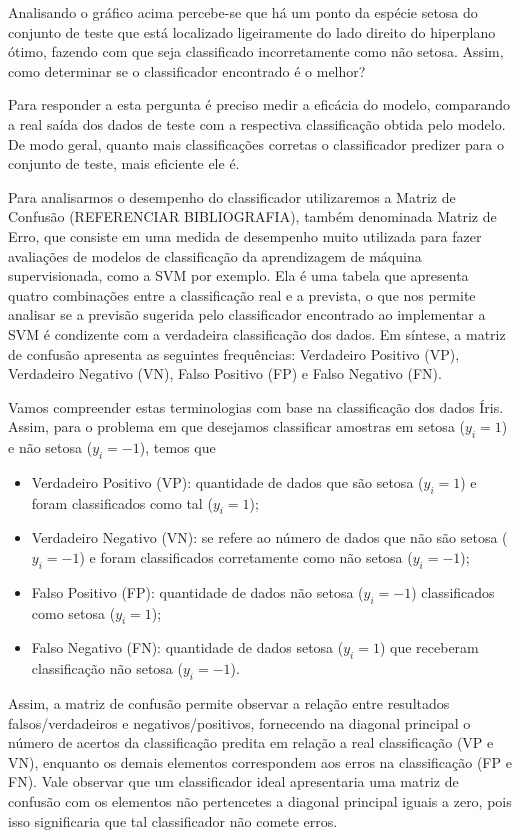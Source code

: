 \documentclass[12pt,a4paper]{scrartcl}
\theoremstyle{definition}%
\begin{document}
    Analisando o gráfico acima percebe-se que há um ponto da espécie setosa
do conjunto de teste que está localizado ligeiramente do lado direito do
hiperplano ótimo, fazendo com que seja classificado incorretamente como
não setosa. Assim, como determinar se o classificador encontrado é o
melhor?

Para responder a esta pergunta é preciso medir a eficácia do modelo,
comparando a real saída dos dados de teste com a respectiva
classificação obtida pelo modelo. De modo geral, quanto mais
classificações corretas o classificador predizer para o conjunto de
teste, mais eficiente ele é.

Para analisarmos o desempenho do classificador utilizaremos a Matriz de
Confusão (REFERENCIAR BIBLIOGRAFIA), também denominada Matriz de Erro,
que consiste em uma medida de desempenho muito utilizada para fazer
avaliações de modelos de classificação da aprendizagem de máquina
supervisionada, como a SVM por exemplo. Ela é uma tabela que apresenta
quatro combinações entre a classificação real e a prevista, o que nos
permite analisar se a previsão sugerida pelo classificador encontrado ao
implementar a SVM é condizente com a verdadeira classificação dos dados.
Em síntese, a matriz de confusão apresenta as seguintes frequências:
Verdadeiro Positivo (VP), Verdadeiro Negativo (VN), Falso Positivo (FP)
e Falso Negativo (FN).

Vamos compreender estas terminologias com base na classificação dos
dados Íris. Assim, para o problema em que desejamos classificar amostras
em setosa (\(y_{i} = 1\)) e não setosa (\(y_{i} = -1\)), temos que

\begin{itemize}
\item
  Verdadeiro Positivo (VP): quantidade de dados que são setosa
  (\(y_{i} = 1\)) e foram classificados como tal (\(y_{i} = 1\));
\item
  Verdadeiro Negativo (VN): se refere ao número de dados que não são
  setosa (\(y_{i} = -1\)) e foram classificados corretamente como não
  setosa (\(y_{i} = -1\));
\item
  Falso Positivo (FP): quantidade de dados não setosa (\(y_{i} = -1\))
  classificados como setosa (\(y_{i} = 1\));
\item
  Falso Negativo (FN): quantidade de dados setosa (\(y_{i} = 1\)) que
  receberam classificação não setosa (\(y_{i} = -1\)).
\end{itemize}

Assim, a matriz de confusão permite observar a relação entre resultados
falsos/verdadeiros e negativos/positivos, fornecendo na diagonal
principal o número de acertos da classificação predita em relação a real
classificação (VP e VN), enquanto os demais elementos correspondem aos
erros na classificação (FP e FN). Vale observar que um classificador
ideal apresentaria uma matriz de confusão com os elementos não
pertencetes a diagonal principal iguais a zero, pois isso significaria
que tal classificador não comete erros.
\end{document}
